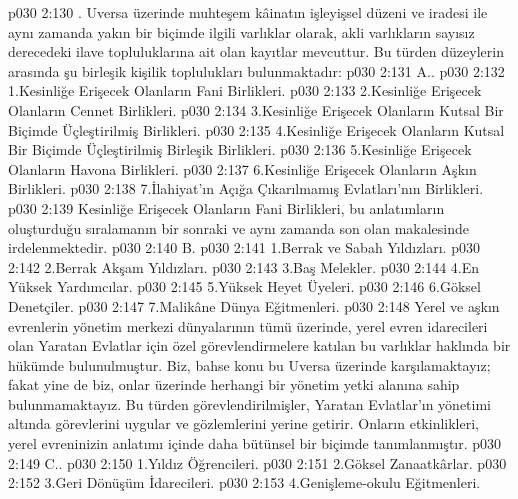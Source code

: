 \vs p030 2:130 . Uversa üzerinde muhteşem kâinatın işleyişsel düzeni ve iradesi ile aynı zamanda yakın bir biçimde ilgili varlıklar olarak, akli varlıkların sayısız derecedeki ilave topluluklarına ait olan kayıtlar mevcuttur. Bu türden düzeylerin arasında şu birleşik kişilik toplulukları bulunmaktadır:
\vs p030 2:131 A.\bibnobreakspace {}.
\vs p030 2:132 1.\bibnobreakspace Kesinliğe Erişecek Olanların Fani Birlikleri.
\vs p030 2:133 2.\bibnobreakspace Kesinliğe Erişecek Olanların Cennet Birlikleri.
\vs p030 2:134 3.\bibnobreakspace Kesinliğe Erişecek Olanların Kutsal Bir Biçimde Üçleştirilmiş Birlikleri.
\vs p030 2:135 4.\bibnobreakspace Kesinliğe Erişecek Olanların Kutsal Bir Biçimde Üçleştirilmiş Birleşik Birlikleri.
\vs p030 2:136 5.\bibnobreakspace Kesinliğe Erişecek Olanların Havona Birlikleri.
\vs p030 2:137 6.\bibnobreakspace Kesinliğe Erişecek Olanların Aşkın Birlikleri.
\vs p030 2:138 7.\bibnobreakspace İlahiyat’ın Açığa Çıkarılmamış Evlatları’nın Birlikleri.
\vs p030 2:139 Kesinliğe Erişecek Olanların Fani Birlikleri, bu anlatımların oluşturduğu sıralamanın bir sonraki ve aynı zamanda son olan makalesinde irdelenmektedir.
\vs p030 2:140 B.\bibnobreakspace {}
\vs p030 2:141 1.\bibnobreakspace Berrak ve Sabah Yıldızları.
\vs p030 2:142 2.\bibnobreakspace Berrak Akşam Yıldızları.
\vs p030 2:143 3.\bibnobreakspace Baş Melekler.
\vs p030 2:144 4.\bibnobreakspace En Yüksek Yardımcılar.
\vs p030 2:145 5.\bibnobreakspace Yüksek Heyet Üyeleri.
\vs p030 2:146 6.\bibnobreakspace Göksel Denetçiler.
\vs p030 2:147 7.\bibnobreakspace Malikâne Dünya Eğitmenleri.
\vs p030 2:148 Yerel ve aşkın evrenlerin yönetim merkezi dünyalarının tümü üzerinde, yerel evren idarecileri olan Yaratan Evlatlar için özel görevlendirmelere katılan bu varlıklar haklında bir hükümde bulunulmuştur. Biz, bahse konu bu  Uversa üzerinde karşılamaktayız; fakat yine de biz, onlar üzerinde herhangi bir yönetim yetki alanına sahip bulunmamaktayız. Bu türden görevlendirilmişler, Yaratan Evlatlar’ın yönetimi altında görevlerini uygular ve gözlemlerini yerine getirir. Onların etkinlikleri, yerel evreninizin anlatımı içinde daha bütünsel bir biçimde tanımlanmıştır.
\vs p030 2:149 C..
\vs p030 2:150 1.\bibnobreakspace Yıldız Öğrencileri.
\vs p030 2:151 2.\bibnobreakspace Göksel Zanaatkârlar.
\vs p030 2:152 3.\bibnobreakspace Geri Dönüşüm İdarecileri.
\vs p030 2:153 4.\bibnobreakspace Genişleme\hyp{}okulu Eğitmenleri.
